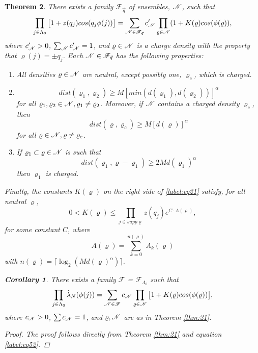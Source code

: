 \documentclass[11pt,reqno]{article}
\newtheorem{thm}{Theorem}[section]
\newtheorem{cor}[thm]{Corollary}
\theoremstyle{definition}
\numberwithin{equation}{section}
\begin{document}
\begin{thm} \label{thm:21}
There exists a family $\mathscr{F}_{\vec{q}}$ of ensembles, $\mathscr{N}$, such that
\begin{equation} \label{label:eq21}
\prod_{j \in \Lambda_0} \big[ 1 + z(q_j)cos(q_j\phi(j)) \big] = 
\sum_{\mathscr{N} \in \mathscr{F}_{\vec{q}}} c_{\mathscr{N}}^\prime \prod_{\varrho \in \mathscr{N}} (1+K(\varrho)cos(\phi(\varrho)),
\end{equation}
where $c_{\mathscr{N}}^\prime > 0$, $\sum_{\mathscr{N}} c_{\mathscr{N}}^\prime = 1$, and $\varrho \in \mathscr{N}$ is a charge density with the property that $\varrho(j)=\pm q_j$. Each $\mathscr{N} \in \mathscr{F}_{\vec{q}}$ has the following properties:
\begin{enumerate}[label={\alph*)}]
\item All densities $\varrho \in \mathscr{N}$ are neutral, except possibly one, $\varrho_c$, which is charged.
\item 
\begin{equation} \label{eq24}
dist(\varrho_1, \varrho_2) \geq M[min(d(\varrho_1), d(\varrho_2))]^\alpha
\end{equation}
for all $\varrho_1, \varrho_2 \in \mathscr{N}, \varrho_1 \neq \varrho_2$. Moreover, if $\mathscr{N}$ contains a charged density $\varrho_c$, then
$$
dist(\varrho, \varrho_c) \geq M[d(\varrho)]^\alpha
$$
for all $\varrho \in \mathscr{N}, \varrho \neq \varrho_c$.
\item
If $\varrho_1 \subset \varrho \in \mathscr{N}$ is such that
\begin{equation}
dist(\varrho_1, \varrho - \varrho_1) \geq 2Md(\varrho_1)^\alpha
\end{equation}
then $\varrho_1$ is charged.
\end{enumerate}
Finally, the constants $K(\varrho)$ on the right side of \eqref{label:eq21} satisfy, for all neutral $\varrho$,
\begin{equation} \label{label:eq26}
0 < K(\varrho) \leq \prod_{j \in supp\varrho} z(q_j)e^{C \cdot A(\varrho)},
\end{equation}
for some constant $C$, where
\begin{equation} \label{label:eq27}
A(\varrho) = \sum_{k=0}^{n(\varrho)} A_k(\varrho)
\end{equation}
with $n(\varrho) = \lceil \log_2(Md(\varrho)^\alpha) \rceil$.

\begin{cor}
There exists a family $\mathscr{F}$ = $\mathscr{F}_{\Lambda_0}$ such that
\begin{equation} \label{label:eq540}
\prod_{j \in \Lambda_0} \hat{\lambda}_N(\phi(j)) = \sum_{\mathscr{N} \in \mathscr{F}} c_{\mathscr{N}} \prod_{\varrho \in \mathscr{N}} \big[ 1 + K(\varrho)cos(\phi(\varrho)) \big],
\end{equation}
where $c_{\mathscr{N}} > 0$, $\sum c_{\mathscr{N}} = 1$, and $\varrho, \mathscr{N}$ are as in Theorem \eqref{thm:21}.
\end{cor}
\begin{proof}
The proof follows directly from Theorem \eqref{thm:21} and equation \eqref{label:eq52}.
\end{proof}

\end{thm}
\end{document}
